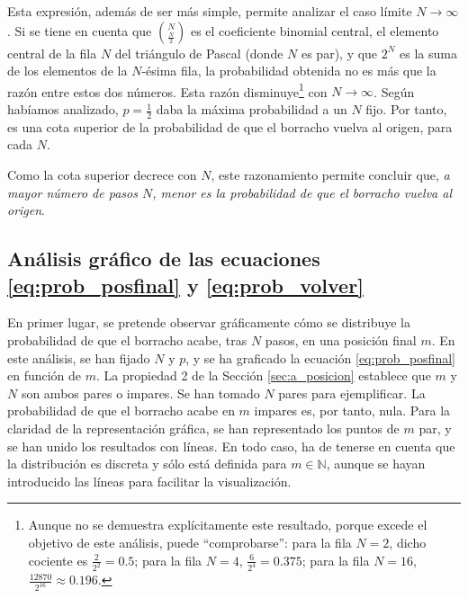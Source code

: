 Esta expresión, además de ser más simple, permite analizar el caso límite $N\to \infty$. Si se tiene en cuenta que $\binom{N}{\frac{N}{2}}$ es el coeficiente binomial central, el elemento central de la fila $N$ del triángulo de Pascal (donde $N$ es par), y que $2^N$ es la suma de los elementos de la $N$-ésima fila, la probabilidad obtenida no es más que la razón entre estos dos números. Esta razón disminuye\footnote{Aunque no se demuestra explícitamente este resultado, porque excede el objetivo de este análisis, puede ``comprobarse'': para la fila $N=2$, dicho cociente es $\frac{2}{2^2} = 0.5$; para la fila $N=4$, $\frac{6}{2^4} = 0.375$; para la fila $N = 16$, $\frac{12870}{2^16} \approx 0.196$.} con $N\to \infty$. Según habíamos analizado, $p=\frac{1}{2}$ daba la máxima probabilidad a un $N$ fijo. Por tanto, es una cota superior de la probabilidad de que el borracho vuelva al origen, para cada $N$. 

Como la cota superior decrece con $N$, este razonamiento permite concluir que, \emph{a mayor número de pasos $N$, menor es la probabilidad de que el borracho vuelva al origen}.

\subsection{Análisis gráfico de las ecuaciones \ref{eq:prob_posfinal} y \ref{eq:prob_volver}}
\label{sec:a_grafico}

En primer lugar, se pretende observar gráficamente cómo se distribuye la probabilidad de que el borracho acabe, tras $N$ pasos, en una posición final $m$. En este análisis, se han fijado $N$ y $p$, y se ha graficado la ecuación \ref{eq:prob_posfinal} en función de $m$. La propiedad 2 de la Sección \ref{sec:a_posicion} establece que $m$ y $N$ son ambos pares o impares. Se han tomado $N$ pares para ejemplificar. La probabilidad de que el borracho acabe en $m$ impares es, por tanto, nula. Para la claridad de la representación gráfica, se han representado los puntos de $m$ par, y se han unido los resultados con líneas. En todo caso, ha de tenerse en cuenta que la distribución es discreta y sólo está definida para $m\in\mathbb N$, aunque se hayan introducido las líneas para facilitar la visualización.

